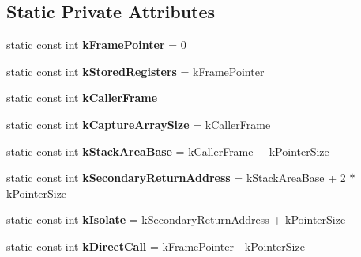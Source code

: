 \subsection*{Static Private Attributes}
\begin{DoxyCompactItemize}
\item 
static const int {\bfseries k\+Frame\+Pointer} = 0\hypertarget{classv8_1_1internal_1_1_reg_exp_macro_assembler_s390_a7f538234f005809df4416c12e52df241}{}\label{classv8_1_1internal_1_1_reg_exp_macro_assembler_s390_a7f538234f005809df4416c12e52df241}

\item 
static const int {\bfseries k\+Stored\+Registers} = k\+Frame\+Pointer\hypertarget{classv8_1_1internal_1_1_reg_exp_macro_assembler_s390_ab02afcc5389e3122e3bbbae1dd1df05f}{}\label{classv8_1_1internal_1_1_reg_exp_macro_assembler_s390_ab02afcc5389e3122e3bbbae1dd1df05f}

\item 
static const int {\bfseries k\+Caller\+Frame}
\item 
static const int {\bfseries k\+Capture\+Array\+Size} = k\+Caller\+Frame\hypertarget{classv8_1_1internal_1_1_reg_exp_macro_assembler_s390_a9cc1b7c4a292158a2946bde12c4f839a}{}\label{classv8_1_1internal_1_1_reg_exp_macro_assembler_s390_a9cc1b7c4a292158a2946bde12c4f839a}

\item 
static const int {\bfseries k\+Stack\+Area\+Base} = k\+Caller\+Frame + k\+Pointer\+Size\hypertarget{classv8_1_1internal_1_1_reg_exp_macro_assembler_s390_ac754bbab5aad0b15005975d15e452472}{}\label{classv8_1_1internal_1_1_reg_exp_macro_assembler_s390_ac754bbab5aad0b15005975d15e452472}

\item 
static const int {\bfseries k\+Secondary\+Return\+Address} = k\+Stack\+Area\+Base + 2 $\ast$ k\+Pointer\+Size\hypertarget{classv8_1_1internal_1_1_reg_exp_macro_assembler_s390_a4d7d30878984a956ac04717a26671c51}{}\label{classv8_1_1internal_1_1_reg_exp_macro_assembler_s390_a4d7d30878984a956ac04717a26671c51}

\item 
static const int {\bfseries k\+Isolate} = k\+Secondary\+Return\+Address + k\+Pointer\+Size\hypertarget{classv8_1_1internal_1_1_reg_exp_macro_assembler_s390_ad340fe4b3a84075561e098f6870189da}{}\label{classv8_1_1internal_1_1_reg_exp_macro_assembler_s390_ad340fe4b3a84075561e098f6870189da}

\item 
static const int {\bfseries k\+Direct\+Call} = k\+Frame\+Pointer -\/ k\+Pointer\+Size\hypertarget{classv8_1_1internal_1_1_reg_exp_macro_assembler_s390_aadf5978762ac18782565ef46dd8042b1}{}\label{classv8_1_1internal_1_1_reg_exp_macro_assembler_s390_aadf5978762ac18782565ef46dd8042b1}


\end{DoxyCompactItemize}
